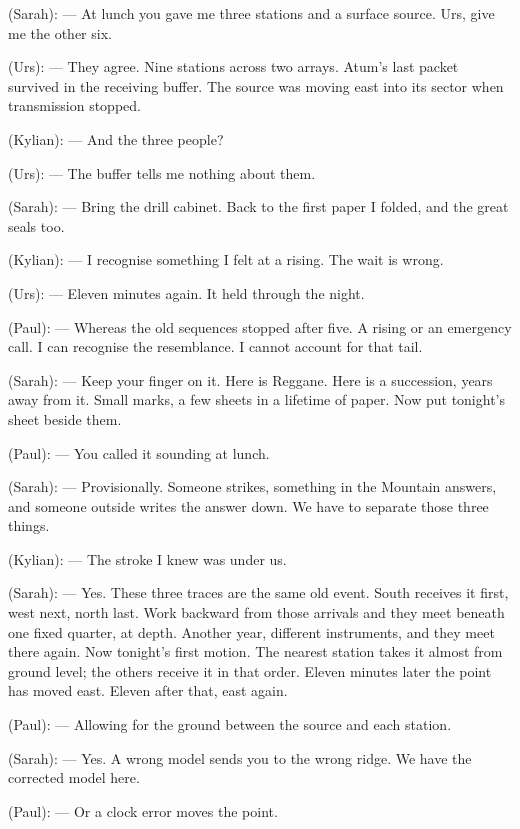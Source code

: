 
\begin{room}

(Sarah): --- At lunch you gave me three stations and a surface source. Urs, give me the other six.

(Urs): --- They agree. Nine stations across two arrays. Atum's last packet survived in the receiving buffer. The source was moving east into its sector when transmission stopped.

(Kylian): --- And the three people?

(Urs): --- The buffer tells me nothing about them.

(Sarah): --- Bring the drill cabinet. Back to the first paper I folded, and the great seals too.

(Kylian): --- I recognise something I felt at a rising. The wait is wrong.

(Urs): --- Eleven minutes again. It held through the night.

(Paul): --- Whereas the old sequences stopped after five. A rising or an emergency call. I can recognise the resemblance. I cannot account for that tail.

(Sarah): --- Keep your finger on it. Here is Reggane. Here is a succession, years away from it. Small marks, a few sheets in a lifetime of paper. Now put tonight's sheet beside them.

(Paul): --- You called it sounding at lunch.

(Sarah): --- Provisionally. Someone strikes, something in the Mountain answers, and someone outside writes the answer down. We have to separate those three things.

(Kylian): --- The stroke I knew was under us.

(Sarah): --- Yes. These three traces are the same old event. South receives it first, west next, north last. Work backward from those arrivals and they meet beneath one fixed quarter, at depth. Another year, different instruments, and they meet there again. Now tonight's first motion. The nearest station takes it almost from ground level; the others receive it in that order. Eleven minutes later the point has moved east. Eleven after that, east again.

(Paul): --- Allowing for the ground between the source and each station.

(Sarah): --- Yes. A wrong model sends you to the wrong ridge. We have the corrected model here.

(Paul): --- Or a clock error moves the point.


\end{room}
